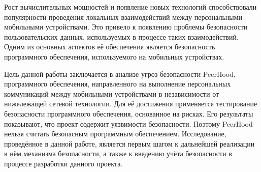 %
Рост вычислительных мощностей и появление новых технологий способствовали популярности проведения локальных взаимодействий между персональными мобильными устройствами. 
%
Это привело к появлению проблемы безопасности пользовательских данных, используемых в процессе таких взаимодействий. 
%
Одним из основных аспектов её обеспечения является безопасность программного обеспечения, используемого на мобильных устройствах. 

%
Цель данной работы заключается в анализе угроз безопасности PeerHood, программного обеспечения, направленного на выполнение персональных коммуникаций между мобильными устройствами в независимости от нижележащей сетевой технологии. 
%
Для её достижения применяется тестирование безопасности программного обеспечения, основанное на рисках. 
%
Его результаты показывают, что проект содержит уязвимости безопасности.
%
Поэтому PeerHood нельзя считать безопасным программным обеспечением. 
%
Исследование, проведённое в данной работе, является первым шагом к дальнейшей реализации в нём механизма безопасности, а также к введению учёта безопасности в процессе разработки данного проекта.

